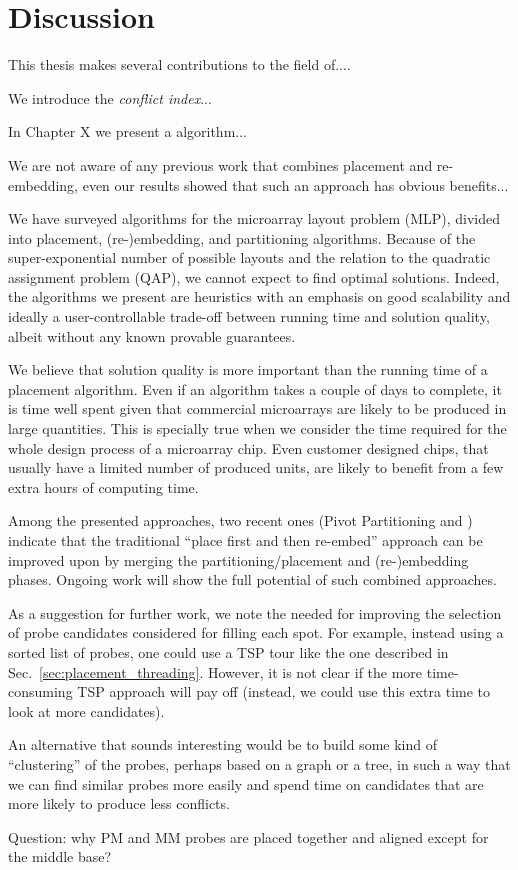 \chapter{Discussion}
\label{ch:discussion}

This thesis makes several contributions to the field of....

We introduce the \emph{conflict index}...

In Chapter X we present a algorithm...

We are not aware of any previous work that combines placement and
re-embedding, even our results showed that such an approach has
obvious benefits...

We have surveyed algorithms for the microarray layout problem (MLP), divided
into placement, (re-)embedding, and partitioning algorithms.  Because of the
super-exponential number of possible layouts and the relation to the quadratic
assignment problem (QAP), we cannot expect to find optimal solutions. Indeed,
the algorithms we present are heuristics with an emphasis on good scalability
and ideally a user-controllable trade-off between running time and solution
quality, albeit without any known provable guarantees.

We believe that solution quality is more important than the running time of a
placement algorithm. Even if an algorithm takes a couple of days to complete,
it is time well spent given that commercial microarrays are likely to be
produced in large quantities. This is specially true when we consider the time
required for the whole design process of a microarray chip. Even customer
designed chips, that usually have a limited number of produced units, are likely
to benefit from a few extra hours of computing time.

Among the presented approaches, two recent ones (Pivot Partitioning and
\Greedyplus) indicate that the traditional ``place first and then re-embed''
approach can be improved upon by merging the partitioning/placement and
(re-)embedding phases. Ongoing work will show the full potential of such
combined approaches.

As a suggestion for further work, we note the needed for improving
the selection of probe candidates considered for filling each spot. For
example, instead using a sorted list of probes, one could use a TSP tour
like the one described in Sec.~\ref{sec:placement_threading}. However,
it is not clear if the more time-consuming TSP approach will pay off
(instead, we could use this extra time to look at more candidates).

An alternative that sounds interesting would be to build some kind of
``clustering'' of the probes, perhaps based on a graph or a tree, in such a
way that we can find similar probes more easily and spend time on candidates
that are more likely to produce less conflicts.

Question: why PM and MM probes are placed together and aligned except for the
middle base?